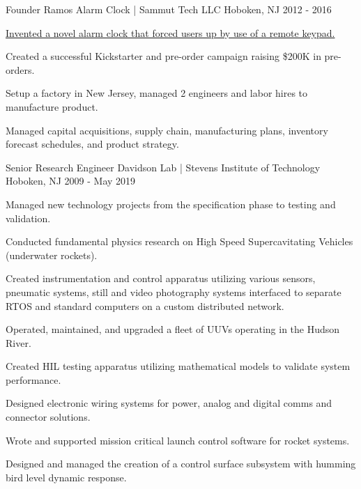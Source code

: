 \begin{cventries}
  \cventry
    {Founder} %
    {Ramos Alarm Clock | Sammut Tech LLC} %
    {Hoboken, NJ} %
    {2012 - 2016} %
    {
      \begin{cvitems} %
        \item {\href{http://bit.ly/2NvLgHA}{Invented a novel alarm clock that forced users up by use of a remote keypad.}}
        \item {Created a successful Kickstarter and pre-order campaign raising \$200K in pre-orders.}
        \item {Setup a factory in New Jersey, managed 2 engineers and labor hires to manufacture product.}
        \item {Managed capital acquisitions, supply chain, manufacturing plans, inventory forecast schedules, and product strategy.}
      \end{cvitems}
    }

  \cventry
    {Senior Research Engineer} %
    {Davidson Lab | Stevens Institute of Technology} %
    {Hoboken, NJ} %
    {2009 - May 2019} %
    {
      \begin{cvitems} %
        \item {Managed new technology projects from the specification phase to testing and validation.} 
        \item {Conducted fundamental physics research on High Speed Supercavitating Vehicles (underwater rockets).}
        \item {Created instrumentation and control apparatus utilizing various sensors, pneumatic systems, still and video photography systems
            interfaced to separate RTOS and standard computers on a custom distributed network.} 
        \item {Operated, maintained, and upgraded a fleet of UUVs operating in the Hudson River.}
        \item {Created HIL testing apparatus utilizing mathematical models to validate system performance.} 
        \item {Designed electronic wiring systems for power, analog and digital comms and connector solutions.}
        \item {Wrote and supported mission critical launch control software for rocket systems.} 
        \item {Designed and managed the creation of a control surface subsystem with humming bird level dynamic response.}
      \end{cvitems}
    }


\end{cventries}

